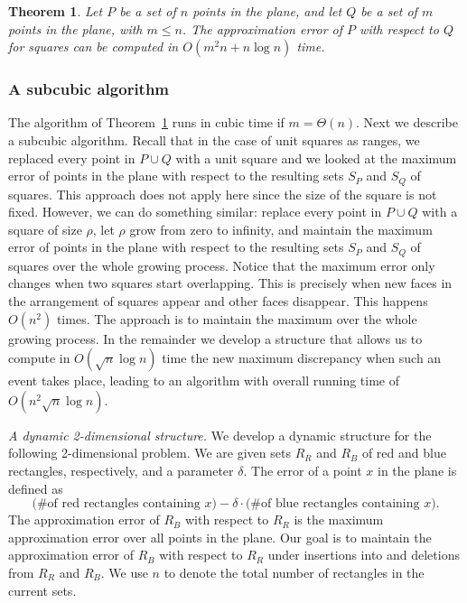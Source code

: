 \documentclass{elsart}
\newtheorem{theorem}[definition]{Theorem}
\begin{document}
\begin{theorem}\label{th:sq_simple}
Let $P$ be a set of $n$ points in the plane, and let $Q$ be a set of
$m$ points in the plane, with $m \leq n$. The approximation error of
$P$ with respect to $Q$ for squares can be computed in $O(m^2n + n\log
n)$ time.
\end{theorem}

  \subsubsection{A subcubic algorithm}
The algorithm of Theorem~\ref{th:sq_simple} runs in cubic time if $m=\Theta(n)$.
Next we describe a subcubic algorithm.
Recall that in the case of unit squares as ranges, we replaced every
point in $P\cup Q$ with a unit square and we looked at the maximum
error of points in the plane with respect to the resulting sets $S_P$
and $S_Q$ of squares. This approach does not apply here since the size
of the square is not fixed. However, we can do something similar:
replace every point in $P\cup Q$ with a square of size $\rho$, let
$\rho$ grow from zero to infinity, and maintain the maximum error of points
in the plane with respect to the resulting sets $S_P$ and $S_Q$ of
squares over the whole growing process. Notice that the maximum error
only changes when two squares start overlapping. This is precisely
when new faces in the arrangement of squares appear and other faces
disappear. This happens $O(n^2)$ times. The approach is to maintain
the maximum over the whole growing process. In the remainder we
develop a structure that allows us to compute in $O(\sqrt{n}\log n)$
time the new maximum discrepancy when such an event takes place,
leading to an algorithm with overall running time of
$O(n^2\sqrt{n}\log n)$.

\emph{A dynamic 2-dimensional structure.}
We develop a dynamic structure for the following 2-dimensional
problem. We are given sets $R_R$ and $R_B$ of red and blue rectangles,
respectively, and a parameter $\delta$. The error of a point $x$ in
the plane is defined as
\[
\mbox{(\# of red rectangles containing $x$)} -
  \delta \cdot \mbox{(\# of blue rectangles containing $x$)}.
\]
The approximation error of $R_B$ with respect to $R_R$ is the maximum
approximation error over all points in the plane. Our goal is to
maintain the approximation error of $R_B$ with respect to $R_R$ under
insertions into and deletions from $R_R$ and $R_B$.  We use $n$ to
denote the total number of rectangles in the current sets.
\end{document}
